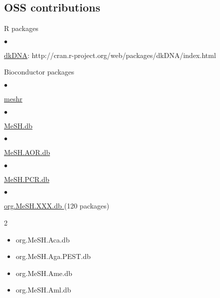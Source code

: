 \documentclass[margin,line,10pt]{res}
\newenvironment{list1}{
  \begin{list}{\ding{113}}{%
      \setlength{\itemsep}{0in}
      \setlength{\parsep}{0in} \setlength{\parskip}{0in}
      \setlength{\topsep}{0in} \setlength{\partopsep}{0in} 
      \setlength{\leftmargin}{0.17in}}}{\end{list}}
\newenvironment{list2}{
  \begin{list}{$\bullet$}{%
      \setlength{\itemsep}{0in}
      \setlength{\parsep}{0in} \setlength{\parskip}{0in}
      \setlength{\topsep}{0in} \setlength{\partopsep}{0in} 
      \setlength{\leftmargin}{0.2in}}}{\end{list}}
\begin{document}
\begin{resume}
\section{\sc OSS contributions} 
\begin{list1}
\item[] R packages
\begin{list2}
\item \textcolor{blue}{\href{http://cran.r-project.org/web/packages/dkDNA/index.html}{dkDNA}}: http://cran.r-project.org/web/packages/dkDNA/index.html
\end{list2}
\vspace{0.3cm}
\item[] Bioconductor packages
\begin{list2}
\item \textcolor{blue}{\href{http://bioconductor.org/packages/release/bioc/html/meshr.html}{meshr}}
\end{list2}
\vspace{0.3cm}
\begin{list2}
\item  \textcolor{blue}{\href{http://bioconductor.org/packages/release/bioc/html/meshr.html}{MeSH.db}}
\end{list2}
\vspace{0.3cm}
\begin{list2}
\item \textcolor{blue}{\href{http://www.bioconductor.org/packages/release/data/annotation/html/MeSH.AOR.db.html}{MeSH.AOR.db}}
\end{list2}
\vspace{0.3cm}
\begin{list2}
\item \textcolor{blue}{\href{http://www.bioconductor.org/packages/release/data/annotation/html/MeSH.PCR.db.html}{MeSH.PCR.db}}
\end{list2}
\vspace{0.3cm}
\begin{list2}
\item \textcolor{blue}{\href{http://www.bioconductor.org/packages/release/data/annotation/}{org.MeSH.XXX.db }} (120 packages)
\end{list2}
\begin{multicols}{2}
\begin{itemize}
\item org.MeSH.Aca.db
\item org.MeSH.Aga.PEST.db
\item org.MeSH.Ame.db
\item org.MeSH.Aml.db

\end{itemize}
\end{multicols}
\end{list1}
\end{resume}
\end{document}
